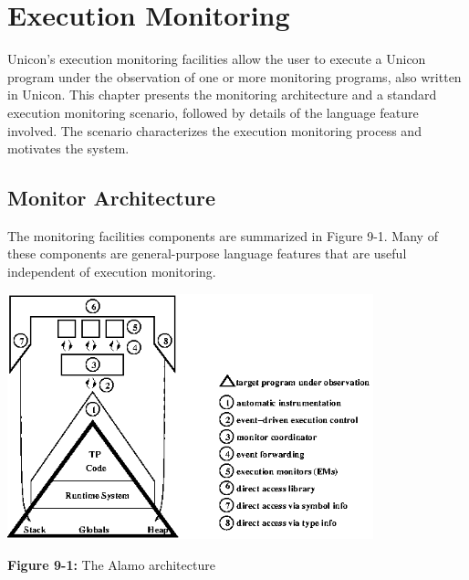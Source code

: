 \chapter{Execution Monitoring}

Unicon's execution monitoring facilities allow the user to execute a Unicon
program under the observation of one or more monitoring programs, also
written in Unicon.  This chapter presents the monitoring architecture and a
standard execution monitoring scenario, followed by details of the language
feature involved.  The scenario characterizes the execution monitoring
process and motivates the system.

\section{Monitor Architecture}

The monitoring facilities components are summarized in Figure 9-1.
Many of these components are general-purpose language features that are
useful independent of execution monitoring.

\begin{center}
\includegraphics[height=2.8in]{alamarch.png}
\end{center}

{\sffamily\bfseries Figure 9-1:}
{\sffamily The Alamo architecture}

\bigskip

